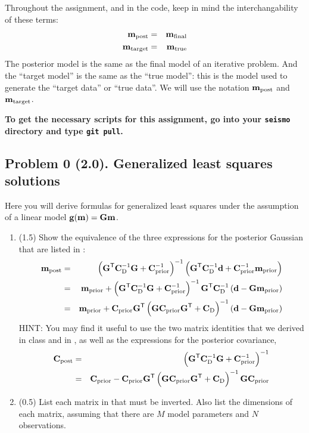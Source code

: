 \documentclass[11pt,titlepage,fleqn]{article}
\begin{document}
Throughout the assignment, and in the code, keep in mind the interchangability of these terms:
%
\begin{eqnarray*}
\mbox{${\bf m}$}_{\rm post} &=& \mbox{${\bf m}$}_{\rm final}
\\
\mbox{${\bf m}$}_{\rm target} &=& \mbox{${\bf m}$}_{\rm true}
\end{eqnarray*}
%
The posterior model is the same as the final model of an iterative problem. And the ``target model'' is the same as the ``true model'': this is the model used to generate the ``target data'' or ``true data''. We will use the notation $\mbox{${\bf m}$}_{\rm post}$ and $\mbox{${\bf m}$}_{\rm target}$.

\bigskip\noindent
{\bf To get the necessary scripts for this assignment, go into your {\tt seismo} directory and type {\tt git pull}.}


\pagebreak
\subsection*{Problem 0 (2.0). Generalized least squares solutions}

Here you will derive formulas for generalized least squares under the assumption of a linear model $\mbox{${\bf g}$}(\mbox{${\bf m}$}) = \mbox{${\bf G}$}\mbox{${\bf m}$}$.
%
\begin{enumerate}
\item (1.5) Show the equivalence of the three expressions for the posterior Gaussian that are listed in \citet[][p.~66]{Tarantola2005}:
%
\begin{eqnarray}
\mbox{${\bf m}$}_{\rm post} &=& \left(\mbox{${\bf G}$}^{\mathsf{T}} \mbox{${\bf C}$}_{\rm D}^{-1} \mbox{${\bf G}$} + \mbox{${\bf C}$}_{\rm prior}^{-1} \right)^{-1}
\left( \mbox{${\bf G}$}^{\mathsf{T}} \mbox{${\bf C}$}_{\rm D}^{-1} \mbox{${\bf d}$} + \mbox{${\bf C}$}_{\rm prior}^{-1}\mbox{${\bf m}$}_{\rm prior} \right)
\label{mpost1}
\\
&=& \mbox{${\bf m}$}_{\rm prior} + \left(\mbox{${\bf G}$}^{\mathsf{T}} \mbox{${\bf C}$}_{\rm D}^{-1} \mbox{${\bf G}$} + \mbox{${\bf C}$}_{\rm prior}^{-1} \right)^{-1} \mbox{${\bf G}$}^{\mathsf{T}} \mbox{${\bf C}$}_{\rm D}^{-1} \left( \mbox{${\bf d}$} - \mbox{${\bf G}$} \mbox{${\bf m}$}_{\rm prior}\right)
\label{mpost2}
\\
&=& \mbox{${\bf m}$}_{\rm prior} + \mbox{${\bf C}$}_{\rm prior} \mbox{${\bf G}$}^{\mathsf{T}} \left( \mbox{${\bf G}$} \mbox{${\bf C}$}_{\rm prior} \mbox{${\bf G}$}^{\mathsf{T}} + \mbox{${\bf C}$}_{\rm D}\right)^{-1} \left( \mbox{${\bf d}$} - \mbox{${\bf G}$} \mbox{${\bf m}$}_{\rm prior}\right)
\label{mpost3}
\end{eqnarray}
%
HINT: You may find it useful to use the two matrix identities that we derived in class and in \citet[][Eq.~6.525]{Tarantola2005}, as well as the expressions for the posterior covariance,
%
\begin{eqnarray}
\mbox{${\bf C}$}_{\rm post} &=& \left(\mbox{${\bf G}$}^{\mathsf{T}} \mbox{${\bf C}$}_{\rm D}^{-1} \mbox{${\bf G}$} + \mbox{${\bf C}$}_{\rm prior}^{-1} \right)^{-1}
\label{cpost1}
\\
&=& \mbox{${\bf C}$}_{\rm prior} - \mbox{${\bf C}$}_{\rm prior} \mbox{${\bf G}$}^{\mathsf{T}} \left( \mbox{${\bf G}$} \mbox{${\bf C}$}_{\rm prior} \mbox{${\bf G}$}^{\mathsf{T}} + \mbox{${\bf C}$}_{\rm D} \right)^{-1} \mbox{${\bf G}$} \mbox{${\bf C}$}_{\rm prior}
\label{cpost2}
\end{eqnarray}

\item (0.5) List each matrix in  that must be inverted. Also list the dimensions of each matrix, assuming that there are $M$ model parameters and $N$ observations.
\end{enumerate}
\end{document}
